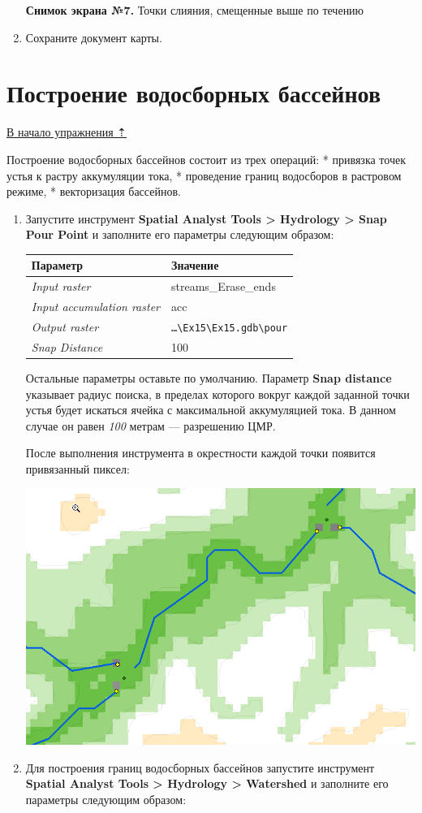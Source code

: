 \documentclass[12pt,]{book}
\begin{document}
\begin{enumerate}
  \textbf{Снимок экрана №7.} Точки слияния, смещенные выше по течению
\item
  Сохраните документ карты.
\end{enumerate}

\hypertarget{dem-watersheds}{%
\section{Построение водосборных бассейнов}\label{dem-watersheds}}

\protect\hyperlink{dem}{В начало упражнения ⇡}

Построение водосборных бассейнов состоит из трех операций:
* привязка точек устья к растру аккумуляции тока,
* проведение границ водосборов в растровом режиме,
* векторизация бассейнов.

\begin{enumerate}
\def\labelenumi{\arabic{enumi}.}
\item
  Запустите инструмент \textbf{Spatial Analyst Tools \textgreater{} Hydrology \textgreater{} Snap Pour Point} и заполните его параметры следующим образом:

  \begin{longtable}[]{@{}ll@{}}
  \toprule
  Параметр & Значение\tabularnewline
  \midrule
  \endhead
  \emph{Input raster} & streams\_Erase\_ends\tabularnewline
  \emph{Input accumulation raster} & acc\tabularnewline
  \emph{Output raster} & \texttt{\ldots{}\textbackslash{}Ex15\textbackslash{}Ex15.gdb\textbackslash{}pour}\tabularnewline
  \emph{Snap Distance} & 100\tabularnewline
  \bottomrule
  \end{longtable}

  Остальные параметры оставьте по умолчанию. Параметр \textbf{Snap distance} указывает радиус поиска, в пределах которого вокруг каждой заданной точки устья будет искаться ячейка с максимальной аккумуляцией тока. В данном случае он равен \emph{100} метрам --- разрешению ЦМР.

  После выполнения инструмента в окрестности каждой точки появится привязанный пиксел:

  \includegraphics{images/Ex15/image23.png}
\item
  Для построения границ водосборных бассейнов запустите инструмент \textbf{Spatial Analyst Tools \textgreater{} Hydrology \textgreater{} Watershed} и заполните его параметры следующим образом:


\end{enumerate}
\end{document}
